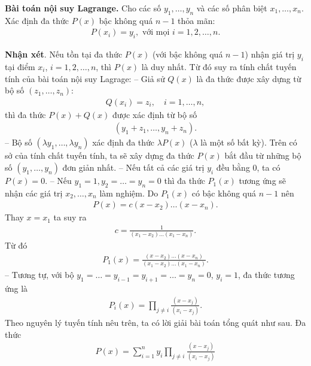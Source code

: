 \begin{multicols}{2}
	\begin{tBox}
		\textbf{\color{hoccungpi}Bài toán nội suy Lagrange.}
		Cho các số $y_1,\ldots, y_n$ và các số phân biệt $x_1,\ldots,x_n$. Xác định đa thức $P(x)$ bậc không quá $n-1$ thỏa mãn:
		\begin{align*}
			P(x_i)=y_i, \text{ với mọi } i=1,2,\ldots, n.
		\end{align*}
	\end{tBox}
	\textbf{\color{hoccungpi}Nhận xét}.
	Nếu tồn tại đa thức $P(x)$ (với bậc không quá $n-1$) nhận giá trị $y_i$ tại điểm $x_i$, 
	$i=1,2,\ldots, n$, thì $P(x)$ là duy nhất. 
	Từ đó suy ra { tính chất tuyến tính} của bài toán nội suy Lagrage:
	\vskip 0.1cm
	-- Giả sử $Q(x)$ là đa thức được xây dựng từ bộ số $(z_1,\ldots, z_n):$
	\begin{align*}
		Q(x_i)=z_i,\quad i=1,\ldots,n,
	\end{align*}
	thì đa thức $P(x)+Q(x)$ được xác định từ bộ số
	\begin{align*}
		(y_1+z_1,\ldots,y_n+z_n).
	\end{align*}
	-- Bộ số $(\lambda y_1,\ldots,\lambda y_n)$ xác định đa thức $\lambda P(x)$ ($\lambda$ là một số bất kỳ).  
	\vskip 0.1cm
	{Trên có sở của tính chất tuyến tính, ta sẽ xây dựng đa thức $P(x)$ bắt đầu từ những bộ số $(y_1,\ldots,y_n)$ đơn giản nhất.} 
	\vskip 0.1cm
	-- Nếu tất cả các giá trị $y_i$ đều bằng $0$, ta có $P(x)=0$.
	\vskip 0.1cm  
	-- Nếu $y_1=1, y_2=\ldots=y_n=0$ thì đa thức $P_1(x)$ tương ứng sẽ nhận các giá trị  $x_2,\ldots,x_n$ làm nghiệm. Do $P_1(x)$ có bậc không quá $n-1$ nên  
	\begin{align*}
		P(x)=c(x-x_2)\ldots(x-x_n).
	\end{align*}
	Thay $x=x_1$ ta suy ra
	\begin{align*}
		c=\frac1{(x_1-x_2)\ldots(x_1-x_n)}.
	\end{align*}
	Từ đó
	\begin{align*}
		P_1(x)=\frac{ (x-x_2)\ldots(x-x_n)}{
			(x_1-x_2)\ldots(x_1-x_n)}.
	\end{align*}
	-- Tương tự, với bộ $y_1=\ldots=y_{i-1}=y_{i+1}=\ldots=y_n=0$, $y_i=1$,  đa thức tương ứng là 
	\begin{align*}
		P_i(x) =\prod_{j\neq i}\frac{(x-x_j)}{ (x_i-x_j)}.
	\end{align*}
	Theo nguyên lý tuyến tính nêu trên, ta có lời giải bài toán tổng quát như sau. Đa thức  
	\begin{align*}
		P(x)=\sum_{i=1}^n y_i\prod_{j\neq i}\frac{(x-x_j)}{ (x_i-x_j)} \tag{$1$}
	\end{align*}

\end{multicols}
